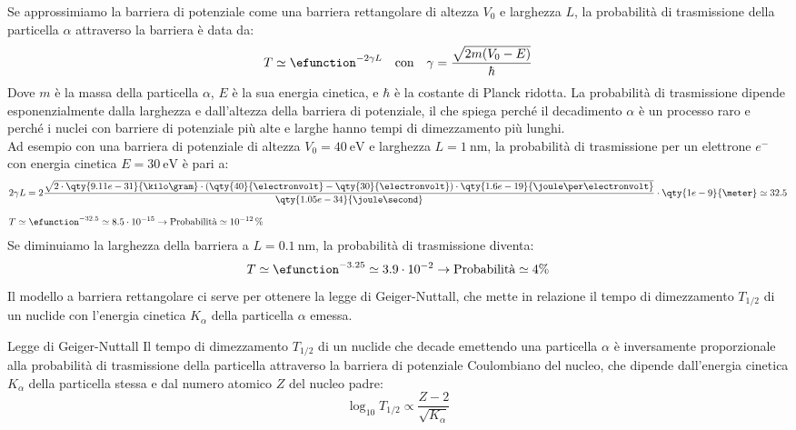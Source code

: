 Se approssimiamo la barriera di potenziale come una barriera rettangolare di altezza $V_0$ e larghezza $L$, la probabilità di trasmissione della particella $\alpha$ attraverso la barriera è data da:
\begin{equation}
    T \simeq \efunction^{-2\gamma L} \quad \text{con} \quad \gamma = \frac{\sqrt{2m(V_0 - E)}}{\hbar}
\end{equation}
Dove $m$ è la massa della particella $\alpha$, $E$ è la sua energia cinetica, e $\hbar$ è la costante di Planck ridotta. La probabilità di trasmissione dipende esponenzialmente dalla larghezza e dall'altezza della barriera di potenziale, il che spiega perché il decadimento $\alpha$ è un processo raro e perché i nuclei con barriere di potenziale più alte e larghe hanno tempi di dimezzamento più lunghi.\\
Ad esempio con una barriera di potenziale di altezza $V_0 = \qty{40}{\electronvolt}$ e larghezza $L = \qty{1}{\nano\meter}$, la probabilità di trasmissione per un elettrone $e^-$ con energia cinetica $E = \qty{30}{\electronvolt}$ è pari a:
\begin{equation}
    \begin{split}
        & 2\gamma L = 2\dfrac{\sqrt{2 \cdot \qty{9.11e-31}{\kilo\gram} \cdot (\qty{40}{\electronvolt} - \qty{30}{\electronvolt}) \cdot \qty{1.6e-19}{\joule\per\electronvolt}}}{\qty{1.05e-34}{\joule\second}} \cdot \qty{1e-9}{\meter} \simeq 32.5 \\[8pt]
        & T \simeq \efunction^{-32.5} \simeq 8.5 \cdot 10^{-15} \rightarrow \text{Probabilità} \simeq 10^{-12} \,\%
    \end{split}
\end{equation}
Se diminuiamo la larghezza della barriera a $L = \qty{0.1}{\nano\meter}$, la probabilità di trasmissione diventa:
\begin{equation}
    T \simeq \efunction^{-3.25} \simeq 3.9 \cdot 10^{-2} \rightarrow \text{Probabilità} \simeq 4 \%
\end{equation}
Il modello a barriera rettangolare ci serve per ottenere la legge di Geiger-Nuttall, che mette in relazione il tempo di dimezzamento $T_{1/2}$ di un nuclide con l'energia cinetica $K_\alpha$ della particella $\alpha$ emessa.

\begin{theorem}{Legge di Geiger-Nuttall}
    Il tempo di dimezzamento $T_{1/2}$ di un nuclide che decade emettendo una particella $\alpha$ è inversamente proporzionale alla probabilità di trasmissione della particella attraverso la barriera di potenziale Coulombiano del nucleo, che dipende dall'energia cinetica $K_\alpha$ della particella stessa e dal numero atomico $Z$ del nucleo padre:
    \begin{equation}
        \log_{10} T_{1/2} \propto \dfrac{Z-2}{\sqrt{K_\alpha}}
    \end{equation}
\end{theorem}

